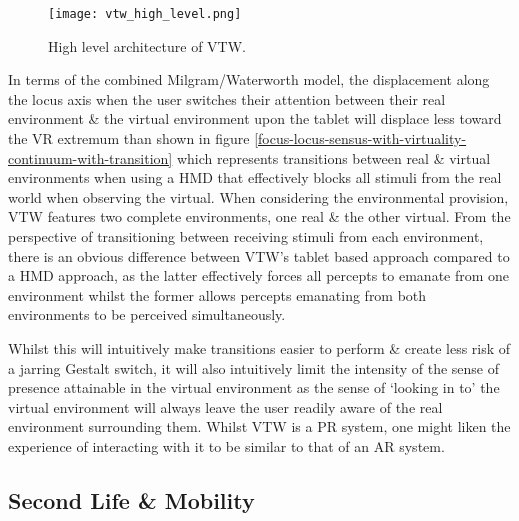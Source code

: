 \begin{figure}[h]
\centering
  \texttt{[image: vtw\_high\_level.png]}
  \caption{High level architecture of VTW.}
  \label{vtw_high_level.png}
\end{figure}

In terms of the combined Milgram/Waterworth model, the displacement along the locus axis when the user switches their attention between their real environment \& the virtual environment upon the tablet will displace less toward the VR extremum than shown in figure \ref{focus-locus-sensus-with-virtuality-continuum-with-transition} which represents transitions between real \& virtual environments when using a HMD that effectively blocks all stimuli from the real world when observing the virtual. When considering the environmental provision, VTW features two complete environments, one real \& the other virtual. From the perspective of transitioning between receiving stimuli from each environment, there is an obvious difference between VTW's tablet based approach compared to a HMD approach, as the latter effectively forces all percepts to emanate from one environment whilst the former allows percepts emanating from both environments to be perceived simultaneously.

Whilst this will intuitively make transitions easier to perform \& create less risk of a jarring Gestalt switch, it will also intuitively limit the intensity of the sense of presence attainable in the virtual environment as the sense of `looking in to' the virtual environment will always leave the user readily aware of the real environment surrounding them. Whilst VTW is a PR system, one might liken the experience of interacting with it to be similar to that of an AR system.




\subsection{Second Life \& Mobility}

